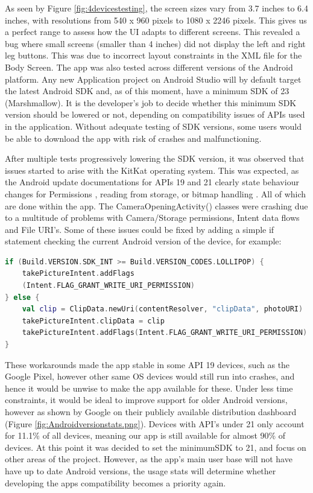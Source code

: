 As seen by Figure \ref{fig:4devicestesting}, the screen sizes vary from 3.7 inches to 6.4 inches, with resolutions from 540 x 960 pixels to 1080 x 2246 pixels. This gives us a perfect range to assess how the UI adapts to different screens. This revealed a bug where small screens (smaller than 4 inches) did not display the left and right leg buttons. This was due to incorrect layout constraints in the XML file for the Body Screen. The app was also tested across different versions of the Android platform. Any new Application project on Android Studio will by default target the latest Android SDK and, as of this moment, have a minimum SDK of 23 (Marshmallow). It is the developer's job to decide whether this minimum SDK version should be lowered or not, depending on compatibility issues of APIs used in the application. Without adequate testing of SDK versions, some users would be able to download the app with risk of crashes and malfunctioning.
\par After multiple tests progressively lowering the SDK version, it was observed that issues started to arise with the KitKat operating system. This was expected, as the Android update documentations for APIs 19 and 21 clearly state behaviour changes for Permissions \cite{androiddevelopers}, reading from storage, or bitmap handling \cite{androiddevelopers2} . All of which are done within the app. The CameraOpeningActivity() classes were crashing due to a multitude of problems with Camera/Storage permissions, Intent data flows and File URI's. Some of these issues could be fixed by adding a simple if statement checking the current Android version of the device, for example:
\begin{lstlisting}[caption={Checking the Android Build Version}, label={lst:checkAndroidVersion}, language=Kotlin]
if (Build.VERSION.SDK_INT >= Build.VERSION_CODES.LOLLIPOP) {
    takePictureIntent.addFlags
    (Intent.FLAG_GRANT_WRITE_URI_PERMISSION)
} else {
    val clip = ClipData.newUri(contentResolver, "clipData", photoURI)
    takePictureIntent.clipData = clip
    takePictureIntent.addFlags(Intent.FLAG_GRANT_WRITE_URI_PERMISSION)
}
\end{lstlisting}
These workarounds made the app stable in some API 19 devices, such as the Google Pixel, however other same OS devices would still run into crashes, and hence it would be unwise to make the app available for these. Under less time constraints, it would be ideal to improve support for older Android versions, however as shown by Google \cite{distributiondashboard} on their publicly available distribution dashboard (Figure \ref{fig:Androidversionstats.png}). Devices with API's under 21 only account for 11.1\% of all devices, meaning our app is still available for almost 90\% of devices. At this point it was decided to set the minimumSDK to 21, and focus on other areas of the project. However, as the app's main user base will not have have up to date Android versions, the usage stats will determine whether developing the apps compatibility becomes a priority again.
